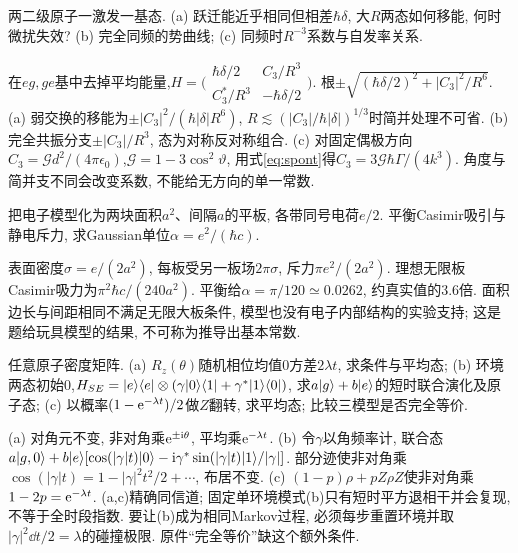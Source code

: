 \begin{exercise}两二级原子一激发一基态. (a) 跃迁能近乎相同但相差$\hbar\delta$, 大$R$两态如何移能, 何时微扰失效? (b) 完全同频的势曲线; (c) 同频时$R^{-3}$系数与自发率关系.\end{exercise}
\begin{solution}在$eg,ge$基中去掉平均能量,$H=\bigl(\begin{smallmatrix}\hbar\delta/2&C_3/R^3\\C_3^*/R^3&-\hbar\delta/2\end{smallmatrix}\bigr)$. 根$\pm\sqrt{(\hbar\delta/2)^2+|C_3|^2/R^6}$. (a) 弱交换的移能为$\pm|C_3|^2/(\hbar|\delta|R^6)$, $R\lesssim(|C_3|/\hbar|\delta|)^{1/3}$时简并处理不可省. (b) 完全共振分支$\pm|C_3|/R^3$, 态为对称反对称组合. (c) 对固定偶极方向$C_3=\mathcal Gd^2/(4\pi\epsilon_0)$,$\mathcal G=1-3\cos^2\vartheta$, 用式\eqref{eq:spont}得$C_3=3\mathcal G\hbar\Gamma/(4k^3)$. 角度与简并支不同会改变系数, 不能给无方向的单一常数.
\end{solution}
\begin{exercise}把电子模型化为两块面积$a^2$、间隔$a$的平板, 各带同号电荷$e/2$. 平衡Casimir吸引与静电斥力, 求Gaussian单位$\alpha=e^2/(\hbar c)$.\end{exercise}
\begin{solution}表面密度$\sigma=e/(2a^2)$, 每板受另一板场$2\pi\sigma$, 斥力$\pi e^2/(2a^2)$. 理想无限板Casimir吸力为$\pi^2\hbar c/(240a^2)$. 平衡给$\alpha=\pi/120\simeq0.0262$, 约真实值的3.6倍. 面积边长与间距相同不满足无限大板条件, 模型也没有电子内部结构的实验支持; 这是题给玩具模型的结果, 不可称为推导出基本常数.
\end{solution}
\begin{exercise}任意原子密度矩阵. (a) $R_z(\theta)$随机相位均值0方差$2\lambda t$, 求条件与平均态; (b) 环境两态初始0,$H_{SE}=\lvert e\rangle\langle e\rvert\otimes(\gamma\lvert 0\rangle\langle 1\rvert+\gamma^*\lvert 1\rangle\langle 0\rvert)$, 求$a\lvert g\rangle+b\lvert e\rangle$的短时联合演化及原子态; (c) 以概率$(1-\mathrm e^{-\lambda t})/2$做$Z$翻转, 求平均态; 比较三模型是否完全等价.\end{exercise}
\begin{solution}(a) 对角元不变, 非对角乘$\mathrm e^{\pm\mathrm i\theta}$, 平均乘$\mathrm e^{-\lambda t}$. (b) 令$\gamma$以角频率计, 联合态$a\lvert g,0\rangle+b\lvert e\rangle[\cos(|\gamma|t)\lvert 0\rangle-\mathrm i\gamma^*\sin(|\gamma|t)\lvert 1\rangle/|\gamma|]$. 部分迹使非对角乘$\cos(|\gamma|t)=1-|\gamma|^2t^2/2+\cdots$, 布居不变. (c) $(1-p)\rho+pZ\rho Z$使非对角乘$1-2p=\mathrm e^{-\lambda t}$. (a,c)精确同信道; 固定单环境模式(b)只有短时平方退相干并会复现, 不等于全时段指数. 要让(b)成为相同Markov过程, 必须每步重置环境并取$|\gamma|^2\dd t/2=\lambda$的碰撞极限. 原件“完全等价”缺这个额外条件.
\end{solution}

